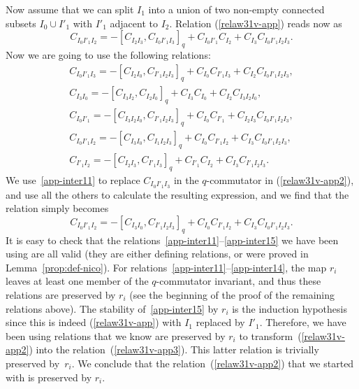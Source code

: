 \documentclass[pdftex]{sigma}
\numberwithin{equation}{section}
\theoremstyle{definition}
\begin{document}
Now assume that we can split $I_1$ into a union of two non-empty connected subsets $I_0\cup I'_1$ with $I'_1$ adjacent to $I_2$. Relation (\ref{relaw31v-app}) reads now as
\begin{equation}\label{relaw31v-app2}C_{I_0I'_1I_2}=-[C_{I_2I_3},C_{I_0I'_1I_3}]_q+C_{I_0I'_1}C_{I_2}+C_{I_3}C_{I_0I'_1I_2I_3} .
\end{equation}
Now we are going to use the following relations:
 \begin{gather}
C_{I_0I'_1I_3} =-[C_{I_2I_0},C_{I'_1I_2I_3}]_q+C_{I_0}C_{I'_1I_3}+C_{I_2}C_{I_0I'_1I_2I_3}, \label{app-inter11} \\
C_{I_3I_0} =-[C_{I_3I_2},C_{I_2I_0}]_q+C_{I_3}C_{I_0}+C_{I_2}C_{I_3I_2I_0},\label{app-inter12} \\
C_{I_0I'_1} =-[C_{I_3I_2I_0},C_{I'_1I_2I_3}]_q+C_{I_0}C_{I'_1}+C_{I_2I_3}C_{I_0I'_1I_2I_3},\label{app-inter13}\\
C_{I_0I'_1I_2} =-[C_{I_3I_0}, C_{I_1I_2I_3}]_q +C_{I_0}C_{I'_1I_2}+C_{I_3}C_{I_0I'_1I_2I_3},\label{app-inter14}\\
C_{I'_1I_2} =-[C_{I_2I_3},C_{I'_1I_3}]_q+C_{I'_1}C_{I_2}+C_{I_3}C_{I'_1I_2I_3}.\label{app-inter15}
 \end{gather}
We use~\eqref{app-inter11} to replace $C_{I_0I'_1I_3}$ in the $q$-commutator in (\ref{relaw31v-app2}), and use all the others to calculate the resulting expression, and we find that the relation simply becomes
\begin{equation}\label{relaw31v-app3}C_{I_0I'_1I_2}=-[C_{I_3I_0},C_{I'_1I_2I_3}]_q+C_{I_0}C_{I'_1I_2}+C_{I_3}C_{I_0I'_1I_2I_3} .
\end{equation}
It is easy to check that the relations~\eqref{app-inter11}--\eqref{app-inter15} we have been using are all valid (they are either defining relations, or were proved in Lemma~\ref{prop:def-nico}). For relations~\eqref{app-inter11}--\eqref{app-inter14}, the map $r_i$ leaves at least one member of the $q$-commutator invariant, and thus these relations are preserved by $r_i$ (see the beginning of the proof of the remaining relations above). The stability of~\eqref{app-inter15} by $r_i$ is the induction hypothesis since this is indeed (\ref{relaw31v-app}) with $I_1$ replaced by $I'_1$. Therefore, we have been using relations that we know are preserved by $r_i$ to transform~(\ref{relaw31v-app2}) into the relation~(\ref{relaw31v-app3}). This latter relation is trivially preserved by~$r_i$. We conclude that the relation~(\ref{relaw31v-app2}) that we started with is preserved by $r_i$.
\end{document}
